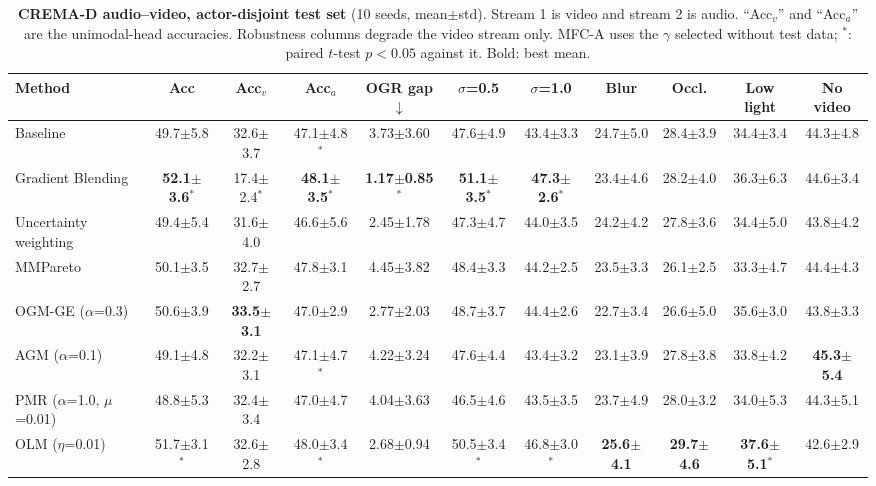 \documentclass[fleqn,10pt]{wlscirep}
\newcommand{\pmm}{$\pm$} %
\begin{document}
\begin{table}[t]
\caption{\textbf{CREMA-D audio--video, actor-disjoint test set} (10 seeds, mean\pmm std). Stream 1 is video and stream 2 is audio. ``Acc$_v$'' and ``Acc$_a$'' are the unimodal-head accuracies. Robustness columns degrade the video stream only. MFC-A uses the $\gamma$ selected without test data; $^{*}$: paired $t$-test $p<0.05$ against it. Bold: best mean.}
\label{tab:main_av}
\centering
\footnotesize
\setlength{\tabcolsep}{3pt}
\begin{tabular}{@{}lcccccccccc@{}}
\toprule
\textbf{Method} & \textbf{Acc} & \textbf{Acc$_v$} & \textbf{Acc$_a$} & \textbf{OGR gap}$\downarrow$ & \textbf{$\sigma$=0.5} & \textbf{$\sigma$=1.0} & \textbf{Blur} & \textbf{Occl.} & \textbf{Low light} & \textbf{No video} \\ \midrule
Baseline & 49.7$\pm$5.8 & 32.6$\pm$3.7 & 47.1$\pm$4.8$^{*}$ & 3.73$\pm$3.60 & 47.6$\pm$4.9 & 43.4$\pm$3.3 & 24.7$\pm$5.0 & 28.4$\pm$3.9 & 34.4$\pm$3.4 & 44.3$\pm$4.8 \\
Gradient Blending & \textbf{52.1$\pm$3.6$^{*}$} & 17.4$\pm$2.4$^{*}$ & \textbf{48.1$\pm$3.5$^{*}$} & \textbf{1.17$\pm$0.85$^{*}$} & \textbf{51.1$\pm$3.5$^{*}$} & \textbf{47.3$\pm$2.6$^{*}$} & 23.4$\pm$4.6 & 28.2$\pm$4.0 & 36.3$\pm$6.3 & 44.6$\pm$3.4 \\
Uncertainty weighting & 49.4$\pm$5.4 & 31.6$\pm$4.0 & 46.6$\pm$5.6 & 2.45$\pm$1.78 & 47.3$\pm$4.7 & 44.0$\pm$3.5 & 24.2$\pm$4.2 & 27.8$\pm$3.6 & 34.4$\pm$5.0 & 43.8$\pm$4.2 \\
MMPareto & 50.1$\pm$3.5 & 32.7$\pm$2.7 & 47.8$\pm$3.1 & 4.45$\pm$3.82 & 48.4$\pm$3.3 & 44.2$\pm$2.5 & 23.5$\pm$3.3 & 26.1$\pm$2.5 & 33.3$\pm$4.7 & 44.4$\pm$4.3 \\
OGM-GE ($\alpha$=0.3) & 50.6$\pm$3.9 & \textbf{33.5$\pm$3.1} & 47.0$\pm$2.9 & 2.77$\pm$2.03 & 48.7$\pm$3.7 & 44.4$\pm$2.6 & 22.7$\pm$3.4 & 26.6$\pm$5.0 & 35.6$\pm$3.0 & 43.8$\pm$3.3 \\
AGM ($\alpha$=0.1) & 49.1$\pm$4.8 & 32.2$\pm$3.1 & 47.1$\pm$4.7$^{*}$ & 4.22$\pm$3.24 & 47.6$\pm$4.4 & 43.4$\pm$3.2 & 23.1$\pm$3.9 & 27.8$\pm$3.8 & 33.8$\pm$4.2 & \textbf{45.3$\pm$5.4} \\
PMR ($\alpha$=1.0, $\mu$=0.01) & 48.8$\pm$5.3 & 32.4$\pm$3.4 & 47.0$\pm$4.7 & 4.04$\pm$3.63 & 46.5$\pm$4.6 & 43.5$\pm$3.5 & 23.7$\pm$4.9 & 28.0$\pm$3.2 & 34.0$\pm$5.3 & 44.3$\pm$5.1 \\
OLM ($\eta$=0.01) & 51.7$\pm$3.1$^{*}$ & 32.6$\pm$2.8 & 48.0$\pm$3.4$^{*}$ & 2.68$\pm$0.94 & 50.5$\pm$3.4$^{*}$ & 46.8$\pm$3.0$^{*}$ & \textbf{25.6$\pm$4.1} & \textbf{29.7$\pm$4.6} & \textbf{37.6$\pm$5.1$^{*}$} & 42.6$\pm$2.9 \\

\end{tabular}
\end{table}
\end{document}
